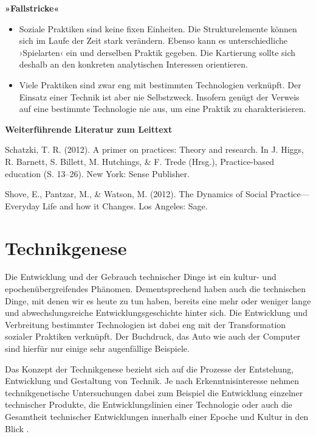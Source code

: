 \documentclass[
  a4paper,
]{book}
\providecommand{\tightlist}{%
  \setlength{\itemsep}{0pt}\setlength{\parskip}{0pt}}
\begin{document}
\textbf{»Fallstricke«}

\begin{itemize}
\tightlist
\item
  Soziale Praktiken sind keine fixen Einheiten. Die Strukturelemente können sich im Laufe der Zeit stark verändern. Ebenso kann es unterschiedliche ›Spielarten‹ ein und derselben Praktik gegeben. Die Kartierung sollte sich deshalb an den konkreten analytischen Interessen orientieren.
\item
  Viele Praktiken sind zwar eng mit bestimmten Technologien verknüpft. Der Einsatz einer Technik ist aber nie Selbstzweck. Insofern genügt der Verweis auf eine bestimmte Technologie nie aus, um eine Praktik zu charakterisieren.
\end{itemize}

\textbf{Weiterführende Literatur zum Leittext}

Schatzki, T. R. (2012). A primer on practices: Theory and research. In J. Higgs, R. Barnett, S. Billett, M. Hutchings, \& F. Trede (Hrsg.), Practice-based education (S. 13--26). New York: Sense Publisher.

Shove, E., Pantzar, M., \& Watson, M. (2012). The Dynamics of Social Practice---Everyday Life and how it Changes. Los Angeles: Sage.

\chapter{Technikgenese}\label{technikgenese}

Die Entwicklung und der Gebrauch technischer Dinge ist ein kultur- und epochenübergreifendes Phänomen. Dementsprechend haben auch die technischen Dinge, mit denen wir es heute zu tun haben, bereits eine mehr oder weniger lange und abwechslungsreiche Entwicklungsgeschichte hinter sich. Die Entwicklung und Verbreitung bestimmter Technologien ist dabei eng mit der Transformation sozialer Praktiken verknüpft. Der Buchdruck, das Auto wie auch der Computer sind hierfür nur einige sehr augenfällige Beispiele.

Das Konzept der Technikgenese bezieht sich auf die Prozesse der Entstehung, Entwicklung und Gestaltung von Technik. Je nach Erkenntnisinteresse nehmen technikgenetische Untersuchungen dabei zum Beispiel die Entwicklung einzelner technischer Produkte, die Entwicklungslinien einer Technologie oder auch die Gesamtheit technischer Entwicklungen innerhalb einer Epoche und Kultur in den Blick \citep{rammertTechnik2010}.
\end{document}
